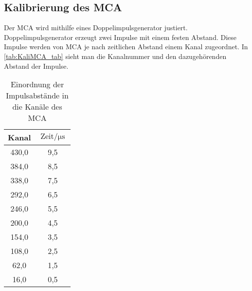 %



\subsection{Kalibrierung des MCA}
\label{sec:KaliMCA}

Der MCA wird mithilfe eines Doppelimpulsgenerator justiert. Doppelimpulsgenerator erzeugt zwei Impulse mit einem festen Abstand.
Diese Impulse werden von MCA je nach zeitlichen Abstand einem Kanal zugeordnet. In \autoref{tab:KaliMCA_tab} sieht man die Kanalnummer und den dazugehörenden Abstand der Impulse.

\begin{table}[H]
    \centering
    \caption{Einordnung der Impulsabstände in die Kanäle des MCA}
    \label{tab:KaliMCA_tab}
    \begin{tabular}{c c}
    \toprule
     Kanal &  $\text{Zeit} \mathbin{/} \unit{\micro\second}$ \\
    \midrule
     430,0 &                             9,5 \\
     384,0 &                             8,5 \\
     338,0 &                             7,5 \\
     292,0 &                             6,5 \\
     246,0 &                             5,5 \\
     200,0 &                             4,5 \\
     154,0 &                             3,5 \\
     108,0 &                             2,5 \\
      62,0 &                             1,5 \\
      16,0 &                             0,5 \\
    \bottomrule
    \end{tabular}
    \end{table}

